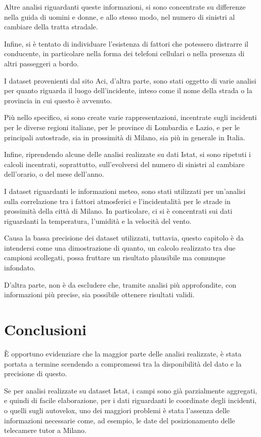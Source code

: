 \documentclass[a4paper]{article}
\newcommand{\skipline}{\vspace{0.2in}}
\begin{document}
Altre analisi riguardanti queste informazioni, si sono concentrate su differenze nella 
guida di uomini e donne, e allo stesso modo, nel numero di sinistri al cambiare 
della tratta stradale. 

Infine, si è tentato di individuare l'esistenza di fattori che 
potessero distrarre il conducente, in particolare nella forma dei telefoni cellulari 
o nella presenza di altri passeggeri a bordo. 

\skipline
I dataset provenienti dal sito Aci, d'altra parte, sono stati oggetto di varie analisi per 
quanto riguarda il luogo dell'incidente, inteso come il nome della strada o la provincia 
in cui questo è avvenuto. 

Più nello specifico, si sono create varie rappresentazioni, incentrate sugli incidenti 
per le diverse regioni italiane, per le province di Lombardia e Lazio, e per le 
principali autostrade, sia in prossimità di Milano, sia più in generale in Italia. 

Infine, riprendendo alcune delle analisi realizzate su dati Istat, si sono ripetuti i 
calcoli incentrati, soprattutto, sull'evolversi del numero di sinistri al 
cambiare dell'orario, o del mese dell'anno.

\skipline
I dataset riguardanti le informazioni meteo, sono stati utilizzati per un'analisi sulla 
correlazione tra i fattori atmosferici e l'incidentalità per le strade in 
prossimità della città di Milano. 
In particolare, ci si è concentrati sui dati riguardanti la temperatura, 
l'umidità e la velocità del vento. 

Causa la bassa precisione dei dataset utilizzati, tuttavia, questo capitolo è 
da intendersi come una dimostrazione di quanto, un calcolo realizzato tra due campioni 
scollegati, possa fruttare un risultato plausibile ma comunque infondato. 

D'altra parte, non è da escludere che, tramite analisi più approfondite, 
con informazioni più precise, sia possibile ottenere risultati validi.

\section{Conclusioni}

\`E opportuno evidenziare che la maggior parte delle analisi realizzate, 
è stata portata a termine scendendo a compromessi tra la disponibilità del dato e la 
precisione di questo. 

Se per analisi realizzate su dataset Istat, i campi sono già 
parzialmente aggregati, e quindi di facile elaborazione, 
per i dati riguardanti le coordinate degli incidenti, 
o quelli sugli autovelox, uno dei maggiori problemi è stata l'assenza delle 
informazioni necessarie come, ad esempio, le date del 
posizionamento delle telecamere tutor a Milano. 
\end{document}
